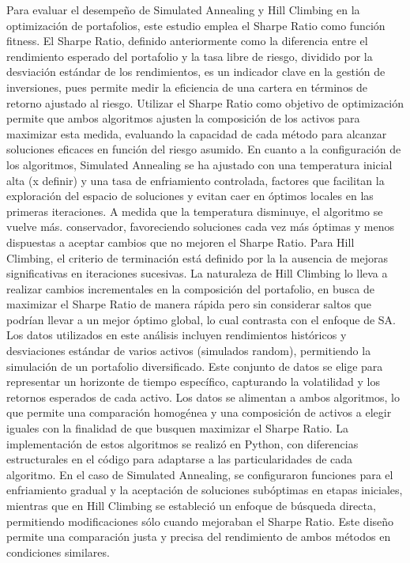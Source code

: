 \documentclass[9pt,a4paper,twoside]{rho-class/rho}
\begin{document}
            Para evaluar el desempeño de Simulated Annealing y Hill Climbing en la optimización de portafolios, este estudio emplea el Sharpe Ratio como función fitness. El Sharpe Ratio, definido anteriormente como la diferencia entre el rendimiento esperado del portafolio y la tasa libre de riesgo, dividido por la desviación estándar de los rendimientos, es un indicador clave en la gestión de inversiones, pues permite medir la eficiencia de una cartera en términos de retorno ajustado al riesgo. Utilizar el Sharpe Ratio como objetivo de optimización permite que ambos algoritmos ajusten la composición de los activos para maximizar esta medida, evaluando la capacidad de cada método para alcanzar soluciones eficaces en función del riesgo asumido.
            En cuanto a la configuración de los algoritmos, Simulated Annealing se ha ajustado con una temperatura inicial alta (x definir) y una tasa de enfriamiento controlada, factores que facilitan la exploración del espacio de soluciones y evitan caer en óptimos locales en las primeras iteraciones. A medida que la temperatura disminuye, el algoritmo se vuelve más.
            conservador, favoreciendo soluciones cada vez más óptimas y menos dispuestas a aceptar cambios que no mejoren el Sharpe Ratio. Para Hill Climbing, el criterio de terminación está definido por la la ausencia de mejoras significativas en iteraciones sucesivas. La naturaleza de Hill Climbing lo lleva a realizar cambios incrementales en la composición del portafolio, en busca de maximizar el Sharpe Ratio de manera rápida pero sin considerar saltos que podrían llevar a un mejor óptimo global, lo cual contrasta con el enfoque de SA.
            Los datos utilizados en este análisis incluyen rendimientos históricos y desviaciones estándar de varios activos (simulados random), permitiendo la simulación de un portafolio diversificado. Este conjunto de datos se elige para representar un horizonte de tiempo específico, capturando la volatilidad y los retornos esperados de cada activo. Los datos se alimentan a ambos algoritmos, lo que permite una comparación homogénea y una composición de activos a elegir iguales con la finalidad de que busquen maximizar el Sharpe Ratio.            La implementación de estos algoritmos se realizó en Python, con diferencias estructurales en el código para adaptarse a las particularidades de cada algoritmo. En el caso de Simulated Annealing, se configuraron funciones para el enfriamiento gradual y la aceptación de soluciones subóptimas en etapas iniciales, mientras que en Hill Climbing se estableció un enfoque de búsqueda directa, permitiendo modificaciones sólo cuando mejoraban el Sharpe Ratio. Este diseño permite una comparación justa y precisa del rendimiento de ambos métodos en condiciones similares.
\end{document}
